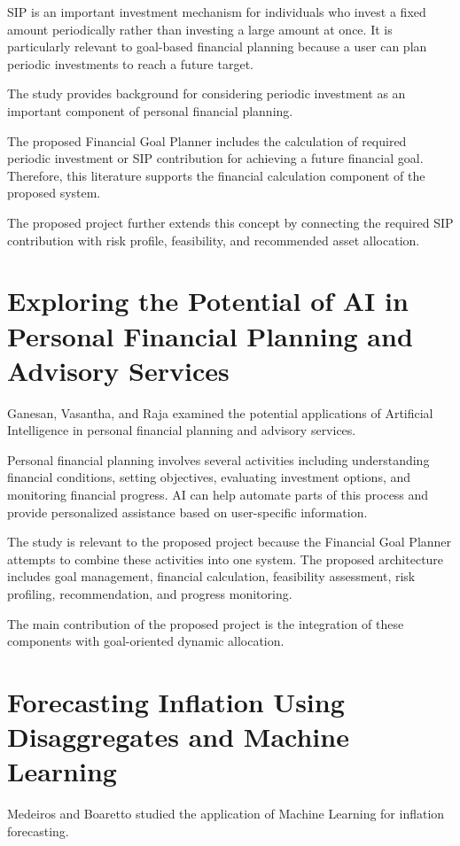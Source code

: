 SIP is an important investment mechanism for individuals who invest a fixed amount periodically rather than investing a large amount at once. It is particularly relevant to goal-based financial planning because a user can plan periodic investments to reach a future target.

The study provides background for considering periodic investment as an important component of personal financial planning.

The proposed Financial Goal Planner includes the calculation of required periodic investment or SIP contribution for achieving a future financial goal. Therefore, this literature supports the financial calculation component of the proposed system.

The proposed project further extends this concept by connecting the required SIP contribution with risk profile, feasibility, and recommended asset allocation.

\section{Exploring the Potential of AI in Personal Financial Planning and Advisory Services}
Ganesan, Vasantha, and Raja examined the potential applications of Artificial Intelligence in personal financial planning and advisory services.

Personal financial planning involves several activities including understanding financial conditions, setting objectives, evaluating investment options, and monitoring financial progress. AI can help automate parts of this process and provide personalized assistance based on user-specific information.

The study is relevant to the proposed project because the Financial Goal Planner attempts to combine these activities into one system. The proposed architecture includes goal management, financial calculation, feasibility assessment, risk profiling, recommendation, and progress monitoring.

The main contribution of the proposed project is the integration of these components with goal-oriented dynamic allocation.

\section{Forecasting Inflation Using Disaggregates and Machine Learning}
Medeiros and Boaretto studied the application of Machine Learning for inflation forecasting.

